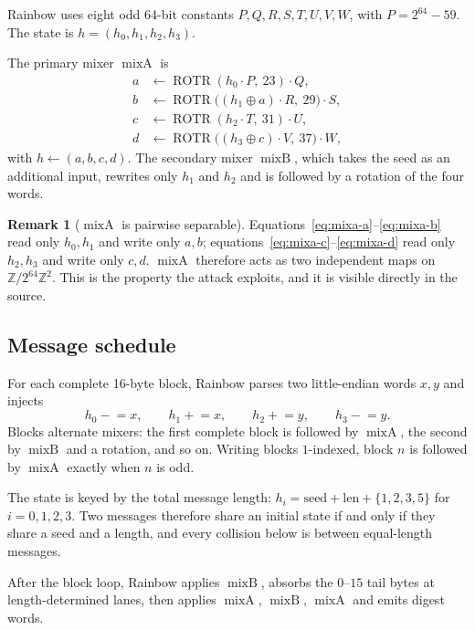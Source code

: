 \documentclass[10pt]{article}
\theoremstyle{definition}
\newtheorem{remark}{Remark}
\newcommand{\W}{\mathbb{Z}/2^{64}\mathbb{Z}}
\newcommand{\ROTR}{\operatorname{ROTR}}
\newcommand{\mixA}{\operatorname{mixA}}
\newcommand{\mixB}{\operatorname{mixB}}
\begin{document}
Rainbow uses eight odd 64-bit constants $P,Q,R,S,T,U,V,W$, with $P = 2^{64}-59$. The state is $h = (h_0,h_1,h_2,h_3)$.

The primary mixer $\mixA$ is
\begin{align}
  a &\leftarrow \ROTR(h_0 \cdot P,\ 23)\cdot Q, \label{eq:mixa-a}\\
  b &\leftarrow \ROTR\big((h_1 \oplus a) \cdot R,\ 29\big)\cdot S, \label{eq:mixa-b}\\
  c &\leftarrow \ROTR(h_2 \cdot T,\ 31)\cdot U, \label{eq:mixa-c}\\
  d &\leftarrow \ROTR\big((h_3 \oplus c) \cdot V,\ 37\big)\cdot W, \label{eq:mixa-d}
\end{align}
with $h \leftarrow (a,b,c,d)$. The secondary mixer $\mixB$, which takes the seed as an additional input, rewrites only $h_1$ and $h_2$ and is followed by a rotation of the four words.

\begin{remark}[$\mixA$ is pairwise separable]
\label{rem:separable}
Equations~\eqref{eq:mixa-a}--\eqref{eq:mixa-b} read only $h_0,h_1$ and write only $a,b$; equations~\eqref{eq:mixa-c}--\eqref{eq:mixa-d} read only $h_2,h_3$ and write only $c,d$. $\mixA$ therefore acts as two independent maps on $\W^2$. This is the property the attack exploits, and it is visible directly in the source.
\end{remark}

\subsection{Message schedule}

For each complete 16-byte block, Rainbow parses two little-endian words $x,y$ and injects
\begin{equation}
  h_0 \mathrel{-}= x,\qquad h_1 \mathrel{+}= x,\qquad h_2 \mathrel{+}= y,\qquad h_3 \mathrel{-}= y.
  \label{eq:inject}
\end{equation}
Blocks alternate mixers: the first complete block is followed by $\mixA$, the second by $\mixB$ and a rotation, and so on. Writing blocks $1$-indexed, block $n$ is followed by $\mixA$ exactly when $n$ is odd.

The state is keyed by the total message length: $h_i = \mathrm{seed} + \mathrm{len} + \{1,2,3,5\}$ for $i=0,1,2,3$. Two messages therefore share an initial state if and only if they share a seed and a length, and every collision below is between equal-length messages.

After the block loop, Rainbow applies $\mixB$, absorbs the $0$--$15$ tail bytes at length-determined lanes, then applies $\mixA$, $\mixB$, $\mixA$ and emits digest words.
\end{document}
